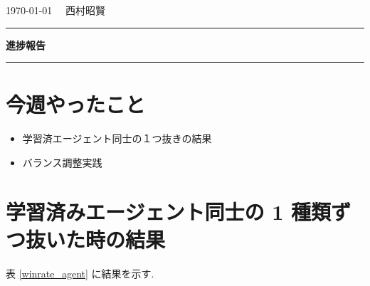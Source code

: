 \documentclass{jarticle}     %
\begin{document}
  \noindent
  \onecolumn
  \hspace{1em}

  \today
  \hfill
  \ \  西村昭賢 

  \vspace{2mm}
  \hrule
  \begin{center}
  {\Large \bf 進捗報告}
  \end{center}
  \hrule
  \vspace{3mm}


\section{今週やったこと}
\begin{itemize}
  \item 学習済エージェント同士の１つ抜きの結果
  \item バランス調整実践
\end{itemize}

\section{学習済みエージェント同士の 1 種類ずつ抜いた時の結果}
表 \ref{winrate_agent} に結果を示す.
\end{document}
